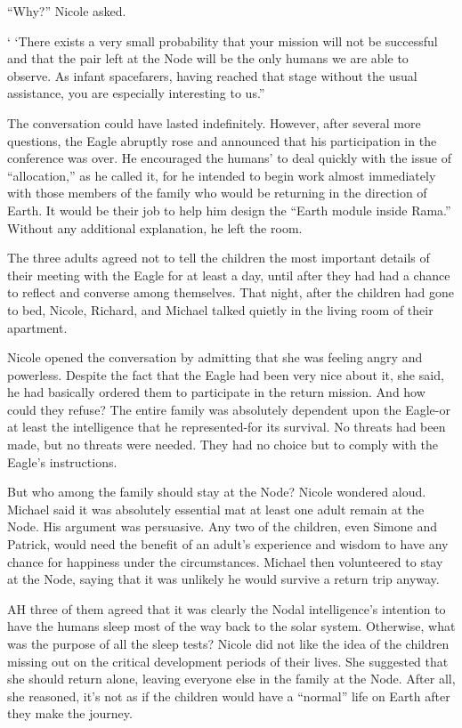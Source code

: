 \documentclass[]{article}
\begin{document}
{“Why?” Nicole asked.

‘ ‘There exists a very small probability that your mission will not be successful and that the pair left at the Node will be the only humans we are able to observe. As infant spacefarers, having reached that stage without the usual assistance, you are especially interesting to us.”

The conversation could have lasted indefinitely. However, after several more questions, the Eagle abruptly rose and announced that his participation in the conference was over. He encouraged the humans’ to deal quickly with the issue of “allocation,” as he called it, for he intended to begin work almost immediately with those members of the family who would be returning in the direction of Earth. It would be their job to help him design the “Earth module inside Rama.” Without any additional explanation, he left the room.

The three adults agreed not to tell the children the most important details of their meeting with the Eagle for at least a day, until after they had had a chance to reflect and converse among themselves. That night, after the children had gone to bed, Nicole, Richard, and Michael talked quietly in the living room of their apartment.

Nicole opened the conversation by admitting that she was feeling angry and powerless. Despite the fact that the Eagle had been very nice about it, she said, he had basically ordered them to participate in the return mission. And how could they refuse? The entire family was absolutely dependent upon the Eagle-or at least the intelligence that he represented-for its survival. No threats had been made, but no threats were needed. They had no choice but to comply with the Eagle’s instructions.

But who among the family should stay at the Node? Nicole wondered aloud. Michael said it was absolutely essential mat at least one adult remain at the Node. His argument was persuasive. Any two of the children, even Simone and Patrick, would need the benefit of an adult’s experience and wisdom to have any chance for happiness under the circumstances. Michael then volunteered to stay at the Node, saying that it was unlikely he would survive a return trip anyway.

AH three of them agreed that it was clearly the Nodal intelligence’s intention to have the humans sleep most of the way back to the solar system. Otherwise, what was the purpose of all the sleep tests? Nicole did not like the idea of the children missing out on the critical development periods of their lives. She suggested that she should return alone, leaving everyone else in the family at the Node. After all, she reasoned, it’s not as if the children would have a “normal” life on Earth after they make the journey.

}
\end{document}
